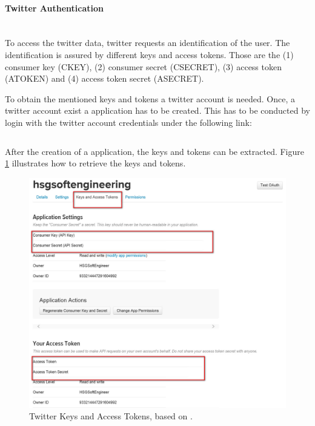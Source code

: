 \documentclass[a4paper,12pt]{article}
\begin{document}
\begin{spacing}{1.2}
\paragraph{Twitter Authentication}\mbox{}\\{}
To access the twitter data, twitter requests an identification of the user. The identification is assured by different keys and access tokens. Those are the (1) consumer key (CKEY), (2) consumer secret (CSECRET), (3) access token (ATOKEN) and (4) access token secret (ASECRET). \parencite{twitterinc2017b}

To obtain the mentioned keys and tokens a twitter account is needed. Once, a twitter account exist a application has to be created. This has to be conducted by login with the twitter account credentials under the following link: 
\begin{lstlisting}[language=bash]
%https://apps.twitter.com/
\end{lstlisting}

After the creation of a application, the keys and tokens can be extracted. Figure \ref{figkeysandtokens} illustrates how to retrieve the keys and tokens.\\
\begin{figure}[H]
\centering
\includegraphics[scale=0.6]{twitteraccess}
\caption{Twitter Keys and Access Tokens, based on \textcite{twitterinc2017c}.}
\label{figkeysandtokens}
\end{figure}


\end{spacing}
\end{document}
